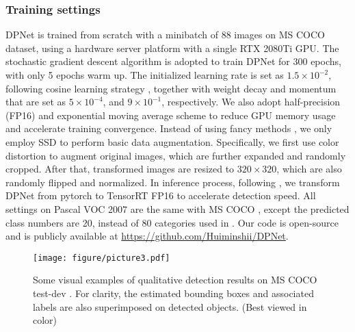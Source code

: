 \documentclass[lettersize,journal]{IEEEtran}
\begin{document}
\subsubsection{Training settings}
DPNet is trained from scratch with a minibatch of 88 images on MS COCO dataset\cite{lin2014microsoft}, using a hardware server platform with a single RTX 2080Ti GPU. The stochastic gradient descent algorithm \cite{bottou2010large} is adopted to train DPNet for 300 epochs, with only 5 epochs warm up. The initialized learning rate is set as $1.5\times10^{-2}$, following cosine learning strategy \cite{loshchilov2016sgdr}, together with weight decay and momentum that are set as $5\times10^{-4}$, and $9\times10^{-1}$, respectively. We also adopt half-precision (FP16) \cite{ge2021yolox} and exponential moving average scheme \cite{micikevicius2017mixed} to reduce GPU memory usage and accelerate training convergence. Instead of using fancy methods \cite{bochkovskiy2020yolov4,zhang2017mixup}, we only employ SSD \cite{liu2016ssd} to perform basic data augmentation. Specifically, we first use color distortion to augment original images, which are further expanded and randomly cropped. After that, transformed images are resized to $320 \times 320$, which are also randomly flipped and normalized. In inference process, following \cite{redmon2018yolov3,wang2021scaled}, we transform DPNet from pytorch to TensorRT FP16 to accelerate detection speed. All settings on Pascal VOC 2007 \cite{everingham2010pascal} are the same with MS COCO \cite{lin2014microsoft}, except the predicted class numbers are 20, instead of 80 categories used in \cite{lin2014microsoft}. Our code is open-source and is publicly available at \url{https://github.com/Huiminshii/DPNet}.

\begin{figure*}[t!] 
	\centering 
	\texttt{[image: figure/picture3.pdf]} 
	\caption{Some visual examples of qualitative detection results on MS COCO test-dev \cite{lin2014microsoft}. For clarity, the estimated bounding boxes and associated labels are also superimposed on detected objects. (Best viewed in color)} 
	\label{Fig:Vis} 
\end{figure*}
\end{document}
